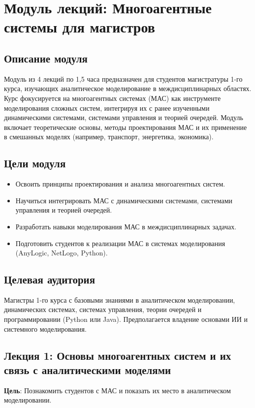 \section*{Модуль лекций: Многоагентные системы для магистров}

\subsection*{Описание модуля}
Модуль из 4 лекций по 1,5 часа предназначен для студентов магистратуры 1-го курса, изучающих аналитическое моделирование в междисциплинарных областях. Курс фокусируется на многоагентных системах (МАС) как инструменте моделирования сложных систем, интегрируя их с ранее изученными динамическими системами, системами управления и теорией очередей. Модуль включает теоретические основы, методы проектирования МАС и их применение в смешанных моделях (например, транспорт, энергетика, экономика).

\subsection*{Цели модуля}
\begin{itemize}
    \item Освоить принципы проектирования и анализа многоагентных систем.
    \item Научиться интегрировать МАС с динамическими системами, системами управления и теорией очередей.
    \item Разработать навыки моделирования МАС в междисциплинарных задачах.
    \item Подготовить студентов к реализации МАС в системах моделирования (AnyLogic, NetLogo, Python).
\end{itemize}

\subsection*{Целевая аудитория}
Магистры 1-го курса с базовыми знаниями в аналитическом моделировании, динамических системах, системах управления, теории очередей и программировании (Python или Java). Предполагается владение основами ИИ и системного моделирования.

\subsection*{Лекция 1: Основы многоагентных систем и их связь с аналитическими моделями}
\textbf{Цель}: Познакомить студентов с МАС и показать их место в аналитическом моделировании.

